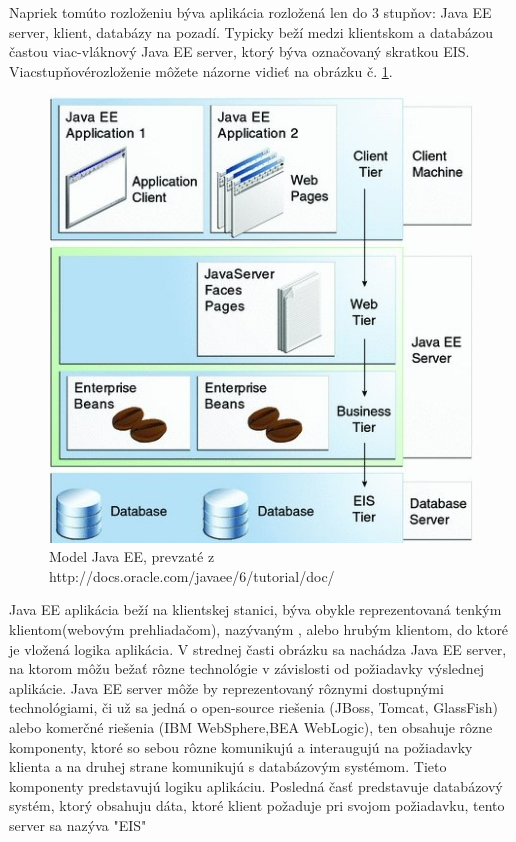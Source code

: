 Napriek tomúto rozloženiu býva aplikácia rozložená len do 3 stupňov: Java EE server, klient, databázy na pozadí. Typicky beží medzi klientskom a databázou častou viac-vláknový Java EE server, ktorý býva označovaný skratkou EIS. Viacstupňovérozloženie môžete názorne vidieť na obrázku č. \ref{model}.
\begin{figure}[htb]

\begin{center}

\includegraphics[scale=0.5]{model.jpg} 
\caption{Model Java EE, prevzaté z  http://docs.oracle.com/javaee/6/tutorial/doc/}
\label{model}

\end{center}

\end{figure}
Java EE aplikácia beží na klientskej stanici, býva obykle reprezentovaná tenkým klientom(webovým prehliadačom), nazývaným , alebo hrubým klientom, do ktoré je vložená logika aplikácia. V strednej časti obrázku sa nachádza Java EE server, na ktorom môžu bežať rôzne technológie v závislosti od požiadavky výslednej aplikácie. Java EE server môže by reprezentovaný rôznymi dostupnými technológiami, či už sa jedná o open-source riešenia (JBoss, Tomcat, GlassFish) alebo komerčné riešenia (IBM WebSphere,BEA WebLogic), ten obsahuje rôzne komponenty, ktoré so sebou rôzne komunikujú a interaugujú na požiadavky klienta a na druhej strane komunikujú s databázovým systémom. Tieto komponenty predstavujú logiku aplikáciu. Posledná časť predstavuje databázový systém, ktorý obsahuju dáta, ktoré klient požaduje pri svojom požiadavku, tento server sa nazýva "EIS" 
\newpage
